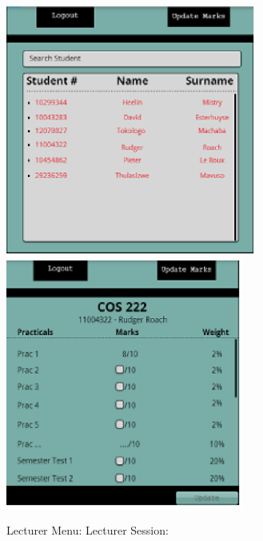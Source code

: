 \documentclass{article}
\begin{document}
\noindent \textbf{\includegraphics*[width=3.26in, height=3.25in, keepaspectratio=false]{image5}  \includegraphics*[width=3.08in, height=3.22in, keepaspectratio=false]{image6}}

\noindent \textbf{}

\noindent 

\noindent 

\noindent 

\noindent 

\noindent 

\noindent 

\noindent 

  Lecturer Menu:     Lecturer Session:
\end{document}
